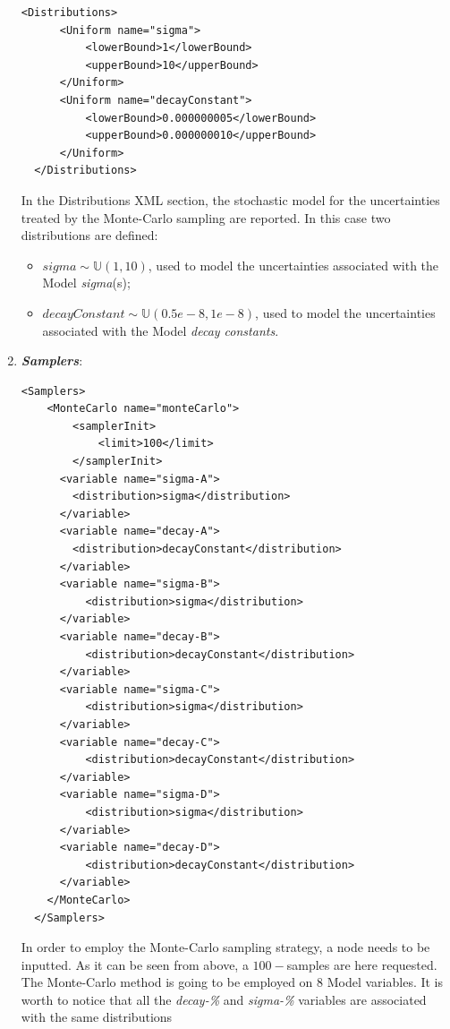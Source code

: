 \begin{enumerate}
\begin{lstlisting}[style=XML,morekeywords={arg,extension,pauseAtEnd,overwrite}]
  <Distributions>
      <Uniform name="sigma">
          <lowerBound>1</lowerBound>
          <upperBound>10</upperBound>
      </Uniform>
      <Uniform name="decayConstant">
          <lowerBound>0.000000005</lowerBound>
          <upperBound>0.000000010</upperBound>
      </Uniform>
  </Distributions>   
\end{lstlisting}
  In the Distributions XML section, the stochastic model for the 
  uncertainties  treated by the Monte-Carlo sampling are reported. In 
  this case two distributions are defined: 
  \begin{itemize}
    \item $sigma \sim \mathbb{U}(1,10)$, used to model the uncertainties 
    associated with  the Model \textit{sigma}(s);
    \item  $decayConstant \sim \mathbb{U}(0.5e-8,1e-8)$,  used to 
    model the uncertainties 
    associated with  the Model \textit{decay constants}.
  \end{itemize}
   \item \textbf{\textit{Samplers}}:
\begin{lstlisting}[style=XML,morekeywords={arg,extension,pauseAtEnd,overwrite}]
  <Samplers>
    <MonteCarlo name="monteCarlo">
        <samplerInit>
            <limit>100</limit>
        </samplerInit>
      <variable name="sigma-A">
        <distribution>sigma</distribution>
      </variable>
      <variable name="decay-A">
        <distribution>decayConstant</distribution>
      </variable>
      <variable name="sigma-B">
          <distribution>sigma</distribution>
      </variable>
      <variable name="decay-B">
          <distribution>decayConstant</distribution>
      </variable>
      <variable name="sigma-C">
          <distribution>sigma</distribution>
      </variable>
      <variable name="decay-C">
          <distribution>decayConstant</distribution>
      </variable>
      <variable name="sigma-D">
          <distribution>sigma</distribution>
      </variable>
      <variable name="decay-D">
          <distribution>decayConstant</distribution>
      </variable>
    </MonteCarlo>
  </Samplers>   
\end{lstlisting}
  In order to employ the Monte-Carlo sampling strategy, a 
   node needs to be inputted. As it can be
  seen from above, a $100-$samples are here requested. The 
  Monte-Carlo method is going to be employed on $8$ Model variables.
  It is worth to notice that all the \textit{decay-\%} and 
  \textit{sigma-\%} variables are associated with the same distributions 

\end{enumerate}
